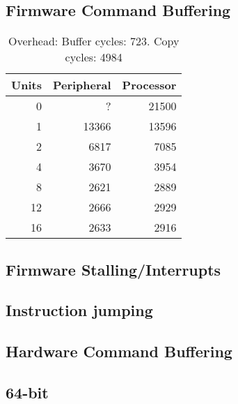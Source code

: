 \documentclass[a4paper,9pt]{report}
\begin{document}
\subsection{Firmware Command Buffering}

\begin{table}
  \centering
  \begin{tabular}{r|rr}
    \toprule
    Units & Peripheral & Processor\\
    \midrule
    0  &     ? & 21500 \\
    1  & 13366 & 13596 \\
    2  &  6817 &  7085 \\
    4  &  3670 &  3954 \\
    8  &  2621 &  2889 \\
    12 &  2666 &  2929 \\
    16 &  2633 &  2916 \\
    \bottomrule
  \end{tabular}
  \caption{Overhead: Buffer cycles: 723. Copy cycles: 4984}
\end{table}

\subsection{Firmware Stalling/Interrupts}
\subsection{Instruction jumping}
\subsection{Hardware Command Buffering}

\subsection{64-bit}
\end{document}
